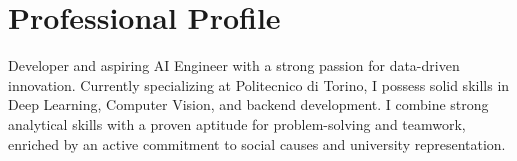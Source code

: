\section{Professional Profile}
{\small
Developer and aspiring AI Engineer with a strong passion for data-driven innovation. Currently specializing at Politecnico di Torino, I possess solid skills in Deep Learning, Computer Vision, and backend development. I combine strong analytical skills with a proven aptitude for problem-solving and teamwork, enriched by an active commitment to social causes and university representation.
}